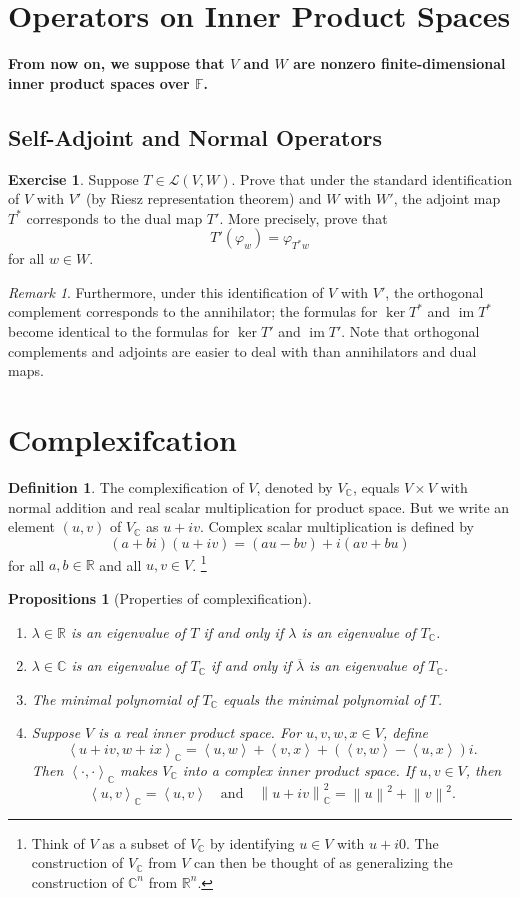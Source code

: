 \documentclass[nofonts,colorlinks]{tufte-handout}
\theoremstyle{plain} %
\newtheorem{props}[thm]{Propositions}
\theoremstyle{definition}
\newtheorem{defn}[thm]{Definition}
\newtheorem{exer}[thm]{Exercise}
\theoremstyle{remark}
\newtheorem{rmk}[thm]{Remark}
\newcommand{\norm}[1]{\mathopen{}\left\lVert#1\right\rVert}
\newcommand{\inp}[2]{\mathopen{}\left\langle#1,#2\right\rangle}
\renewcommand{\phi}{\varphi}
\newcommand{\R}{\mathbb{R}}
\newcommand{\C}{\mathbb{C}}
\newcommand{\F}{\mathbb{F}}
\renewcommand{\L}{\mathcal{L}}
\DeclareMathOperator{\im}{im}
\begin{document}
\section{Operators on Inner Product Spaces}
\textbf{From now on, we suppose that $V$ and $W$ are nonzero finite-dimensional inner product spaces over $\F$.}
\subsection{Self-Adjoint and Normal Operators}
\begin{exer}
	Suppose $T\in\L(V,W)$. Prove that under the standard identification of $V$ with $V'$ (by Riesz representation theorem) and $W$ with $W'$, the adjoint map $T^*$ corresponds to the dual map $T'$. More precisely, prove that
	\[T'(\phi_w)=\phi_{T^*w}\]
	for all $w\in W$.
\end{exer}

\begin{rmk}
	Furthermore, under this identification of $V$ with $V'$, the orthogonal complement corresponds to the annihilator; the formulas for $\ker T^*$ and $\im T^*$ become identical to the formulas for $\ker T'$ and $\im T'$. Note that orthogonal complements and adjoints are easier to deal with than annihilators and dual maps.
\end{rmk}


\section{Complexifcation}
\begin{defn}
	The complexification of $V$, denoted by $V_\C$, equals $V\times V$ with normal addition and real scalar multiplication for product space. But we write an element $(u,v)$ of $V_\C$ as $u+iv$. Complex scalar multiplication is defined by
	\[(a+bi)(u+iv)=(au-bv)+i(av+bu)\]
	for all $a,b\in\R$ and all $u,v\in V$.%
	\footnote{Think of $V$ as a subset of $V_\C$ by identifying $u\in V$ with $u+i0$. The construction of $V_\C$ from $V$ can then be thought of as generalizing the construction of $\C^n$ from $\R^n$.}
\end{defn}

\begin{props}[Properties of complexification]
	\begin{enumerate}
		\item $\lambda\in\R$ is an eigenvalue of $T$ if and only if $\lambda$ is an eigenvalue of $T_\C$.
		\item $\lambda\in\C$ is an eigenvalue of $T_\C$ if and only if $\overline{\lambda}$ is an eigenvalue of $T_\C$.
		\item The minimal polynomial of $T_\C$ equals the minimal polynomial of $T$.
		\item Suppose $V$ is a real inner product space. For $u,v,w,x\in V$, define
		\[\inp{u+iv}{w+ix}_\C=\inp{u}{w}+\inp{v}{x}+(\inp{v}{w}-\inp{u}{x})i.\]
		Then $\inp{\cdot}{\cdot}_\C$ makes $V_\C$ into a complex inner product space. If $u,v\in V$, then
		\[\inp{u}{v}_\C=\inp{u}{v}\quad\text{and}\quad\norm{u+iv}_\C^2=\norm{u}^2+\norm{v}^2.\]
	\end{enumerate}
\end{props}
\end{document}
